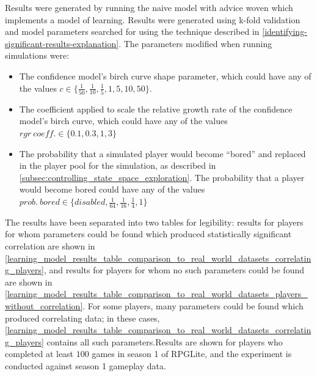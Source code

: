 Results were generated by running the naive model with advice woven which implements a
model of learning. Results were generated using k-fold validation and model
parameters searched for using the technique described in
\cref{identifying-significant-results-explanation}. The parameters modified when
running simulations were:

\begin{itemize}
  \item The confidence model's birch curve shape parameter, which could have any
  of the values $c \in \{\frac{1}{50}, \frac{1}{10},
    \frac{1}{5}, 1, 5, 10, 50\}$.
    \item The coefficient applied to scale the relative growth rate of the
    confidence model's birch curve, which could have any of the values $rgr
    ~ coeff. \in \{0.1, 0.3, 1, 3\}$
    \item The probability that a simulated player would become ``bored'' and
    replaced in the player pool for the simulation, as described in
    \cref{subsec:controlling_state_space_exploration}. The probability that a
    player would become bored could have any of the values $prob.~bored \in
    \{disabled, \frac{1}{64}, \frac{1}{16}, \frac{1}{4}, 1\}$
\end{itemize}

The results have been separated into two tables for
legibility: results for players for whom parameters could be found which produced statistically
significant correlation are shown in 
\cref{learning_model_results_table_comparison_to_real_world_datasets_correlating_players},
and results for players for whom no such parameters could be found are shown in
\cref{learning_model_results_table_comparison_to_real_world_datasets_players_without_correlation}.
For some players, many parameters could be found which produced correlating
data; in these cases,
\cref{learning_model_results_table_comparison_to_real_world_datasets_correlating_players}
contains all such parameters.Results
are shown for players who completed at least $100$ games in season 1 of RPGLite,
and the experiment is conducted against season 1 gameplay data.


